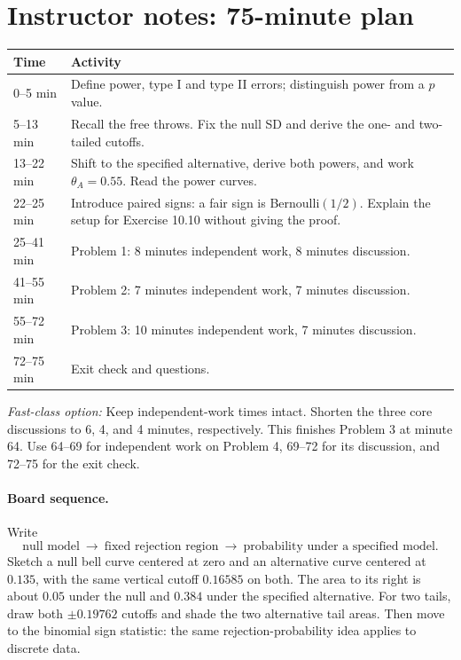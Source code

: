 \documentclass[11pt]{article}
\begin{document}
\section*{Instructor notes: 75-minute plan}
\begin{center}
\begin{tabular}{@{}p{}p{}@{}}
\toprule Time & Activity\\\midrule
0--5 min & Define power, type I and type II errors; distinguish power
from a $p$ value.\\
5--13 min & Recall the free throws. Fix the null SD and derive the
one- and two-tailed cutoffs.\\
13--22 min & Shift to the specified alternative, derive both powers,
and work $\theta_A=0.55$. Read the power curves.\\
22--25 min & Introduce paired signs: a fair sign is Bernoulli$(1/2)$.
Explain the setup for Exercise 10.10 without giving the proof.\\
25--41 min & Problem 1: 8 minutes independent work, 8 minutes discussion.\\
41--55 min & Problem 2: 7 minutes independent work, 7 minutes discussion.\\
55--72 min & Problem 3: 10 minutes independent work, 7 minutes discussion.\\
72--75 min & Exit check and questions.\\\bottomrule
\end{tabular}
\end{center}
\noindent\textit{Fast-class option:} Keep independent-work times intact.
Shorten the three core discussions to 6, 4, and 4 minutes, respectively.
This finishes Problem 3 at minute 64. Use 64--69 for independent work on
Problem 4, 69--72 for its discussion, and 72--75 for the exit check.

\paragraph{Board sequence.}
Write
\[
 \text{null model}\ \longrightarrow\ \text{fixed rejection region}
 \ \longrightarrow\ \text{probability under a specified model}.
\]
Sketch a null bell curve centered at zero and an alternative curve centered
at $0.135$, with the same vertical cutoff $0.16585$ on both.
The area to its right is about $0.05$ under the null and $0.384$ under
the specified alternative. For two tails, draw both $\pm0.19762$ cutoffs
and shade the two alternative tail areas. Then move to the binomial
sign statistic: the same rejection-probability idea applies to discrete data.
\end{document}
